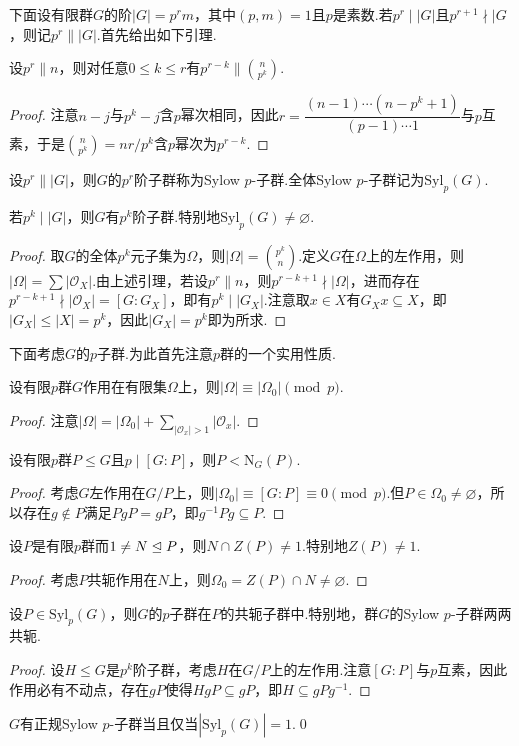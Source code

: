 下面设有限群$G$的阶$|G|=p^rm$，其中$(p,m)=1$且$p$是素数.若$p^r\mid|G|$且$p^{r+1}\nmid|G$，则记$p^r\parallel|G|$.首先给出如下引理.
\begin{lemma}
	设$p^r\parallel n$，则对任意$0\le k\le r$有$p^{r-k}\parallel\displaystyle\binom{n}{p^k}$.
\end{lemma}
\begin{proof}
	注意$n-j$与$p^k-j$含$p$幂次相同，因此$r=\dfrac{(n-1)\cdots(n-p^k+1)}{(p-1)\cdots1}$与$p$互素，于是$\displaystyle\binom{n}{p^k}=nr/p^k$含$p$幂次为$p^{r-k}$.
\end{proof}

设$p^r\parallel |G|$，则$G$的$p^r$阶子群称为{\heiti Sylow $p$-子群}.全体Sylow $p$-子群记为$\mathrm{Syl}_p(G)$.
\begin{thm}[(Sylow第一定理)]
	若$p^k\mid|G|$，则$G$有$p^k$阶子群.特别地$\mathrm{Syl}_p(G)\ne\varnothing$.
\end{thm}
\begin{proof}
	取$G$的全体$p^k$元子集为$\Omega$，则$|\Omega|=\displaystyle\binom{p^k}{n}$.定义$G$在$\Omega$上的左作用，则$|\Omega|=\sum|\mathcal{O}_X|$.由上述引理，若设$p^r\parallel n$，则$p^{r-k+1}\nmid|\Omega|$，进而存在$p^{r-k+1}\nmid|\mathcal{O}_X|=[G:G_X]$，即有$p^k\mid|G_X|$.注意取$x\in X$有$G_Xx\subseteq X$，即$|G_X|\le|X|=p^k$，因此$|G_X|=p^k$即为所求.
\end{proof}

下面考虑$G$的$p$子群.为此首先注意$p$群的一个实用性质.
\begin{prop}
	设有限$p$群$G$作用在有限集$\Omega$上，则$|\Omega|\equiv|\Omega_0|\pmod{p}$.
\end{prop}
\begin{proof}
	注意$|\Omega|=|\Omega_0|+\sum_{|\mathcal{O}_x|>1}|\mathcal{O}_x|$.
\end{proof}
\begin{prop}
	设有限$p$群$P\le G$且$p\mid[G:P]$，则$P<\mathrm{N}_G(P)$.\hypertarget{prop:NormalConditionOfpSubgrp}{}
\end{prop}
\begin{proof}
	考虑$G$左作用在$G/P$上，则$|\Omega_0|\equiv[G:P]\equiv 0\pmod{p}$.但$P\in\Omega_0\ne\varnothing$，所以存在$g\notin P$满足$PgP=gP$，即$g^{-1}Pg\subseteq P$.
\end{proof}
\begin{prop}
	设$P$是有限$p$群而$1\ne N\trianglelefteq P$，则$N\cap Z(P)\ne 1$.特别地$Z(P)\ne 1$.\hypertarget{prop:NormalityLargeOfpGrp}{}
\end{prop}
\begin{proof}
	考虑$P$共轭作用在$N$上，则$\Omega_0=Z(P)\cap N\ne\varnothing$.
\end{proof}
\begin{thm}[(Sylow第二定理)]
	设$P\in\mathrm{Syl}_p(G)$，则$G$的$p$子群在$P$的共轭子群中.特别地，群$G$的Sylow $p$-子群两两共轭.
\end{thm}
\begin{proof}
	设$H\le G$是$p^k$阶子群，考虑$H$在$G/P$上的左作用.注意$[G:P]$与$p$互素，因此作用必有不动点，存在$gP$使得$HgP\subseteq gP$，即$H\subseteq gPg^{-1}$.
\end{proof}
\begin{cor*}
	$G$有正规Sylow $p$-子群当且仅当$|\mathrm{Syl}_p(G)|=1$.\qed
\end{cor*}

